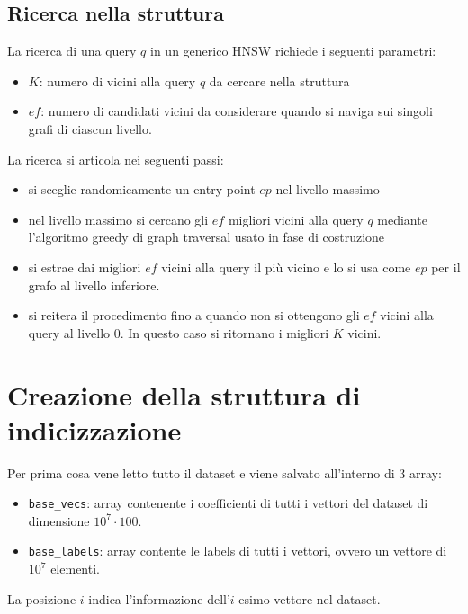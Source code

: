 \subsection{Ricerca nella struttura}
La ricerca di una query $q$ in un generico HNSW richiede i seguenti parametri:
\begin{itemize}
    \item $K$: numero di vicini alla query $q$ da cercare nella struttura
    \item $ef$: numero di candidati vicini da considerare quando si naviga sui singoli 
    grafi di ciascun livello.
\end{itemize}

La ricerca si articola nei seguenti passi:
\begin{itemize}
    \item si sceglie randomicamente un entry point $ep$ nel livello massimo
    \item nel livello massimo si cercano gli $ef$ migliori vicini alla query 
    $q$ mediante l'algoritmo greedy di graph traversal usato in fase di costruzione
    \item si estrae dai migliori $ef$ vicini alla query il più vicino e lo si usa 
    come $ep$ per il grafo al livello inferiore.
    \item si reitera il procedimento fino a quando non si ottengono gli $ef$ vicini 
    alla query al livello $0$. In questo caso si ritornano i migliori $K$ vicini.
\end{itemize}  

\section{Creazione della struttura di indicizzazione}
Per prima cosa vene letto tutto il dataset e viene salvato
all'interno di $3$ array:
\begin{itemize}
    \item \texttt{base\_vecs}: array contenente i coefficienti di tutti i vettori del dataset
    di dimensione $10^7\cdot 100$.
    \item \texttt{base\_labels}: array contente le labels di tutti i vettori, ovvero un 
    vettore di $10^7$ elementi.
\end{itemize} 

\begin{nota}
    La posizione $i$ indica  l'informazione dell'$i$-esimo vettore nel dataset.
\end{nota}

